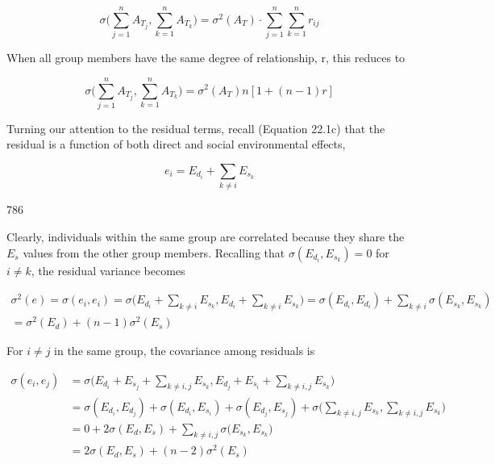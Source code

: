 \documentclass{article}
\begin{document}
\begin{equation}
\sigma\Bigg(\sum_{j=1}^{n}A_{T_{j}},\sum_{k=1}^{n}A_{T_{k}}\Bigg)=\sigma^{2}(A_{T})\cdot\sum_{j=1}^{n}\sum_{k=1}^{n}r_{ij}
\tag{22.21a}
\label{eq:22_21a}
\end{equation}

When all group members have the same degree of relationship, r, this reduces to

\begin{equation}
\sigma\Bigg(\sum_{j=1}^{n}A_{T_{j}},\sum_{k=1}^{n}A_{T_{k}}\Bigg)=\sigma^{2}(A_{T})n\left[1+(n-1)r\right]
\tag{22.21b}
\label{eq:22_21b}
\end{equation}

Turning our attention to the residual terms, recall (Equation 22.1c) that the residual is a function of both direct and social environmental effects,

\begin{equation}
e_{i}=E_{d_{i}}+\sum_{k\neq i}E_{s_{k}}
\end{equation}

786

Clearly, individuals within the same group are correlated because they share the  $ E_s $ values from the other group members. Recalling that  $ \sigma(E_{d_i}, E_{s_k}) = 0 $ for  $ i \neq k $, the residual variance becomes

\begin{equation}
\begin{align*}\sigma^{2}(e)=\sigma(e_{i},e_{i})=\sigma\Biggl(E_{d_{i}}+\sum_{k\neq i}E_{s_{k}},E_{d_{i}}+\sum_{k\neq i}E_{s_{k}}\Biggr)=\sigma\left(E_{d_{i}},E_{d_{i}}\right)+\sum_{k\neq i}\sigma\left(E_{s_{k}},E_{s_{k}}\right)\\=\sigma^{2}(E_{d})+(n-1)\sigma^{2}(E_{s})\tag{22.22}\end{align*}
\end{equation}

For  $ i \neq j $ in the same group, the covariance among residuals is

\begin{equation}
\begin{align*}\sigma(e_{i},e_{j})&=\sigma\Big(E_{d_{i}}+E_{s_{j}}+\sum_{k\neq i,j}E_{s_{k}},E_{d_{j}}+E_{s_{i}}+\sum_{k\neq i,j}E_{s_{k}}\Big)\\&=\sigma\left(E_{d_{i}},E_{d_{j}}\right)+\sigma\left(E_{d_{i}},E_{s_{i}}\right)+\sigma\left(E_{d_{j}},E_{s_{j}}\right)+\sigma\Big(\sum_{k\neq i,j}E_{s_{k}},\sum_{k\neq i,j}E_{s_{k}}\Big)\\&=0+2\sigma(E_{d},E_{s})+\sum_{k\neq i,j}\sigma\Big(E_{s_{k}},E_{s_{k}}\Big)\\&=2\sigma(E_{d},E_{s})+(n-2)\sigma^{2}(E_{s})\tag{2}\end{align*}
\tag{22.22b}
\label{eq:22_22b}
\end{equation}
\end{document}
